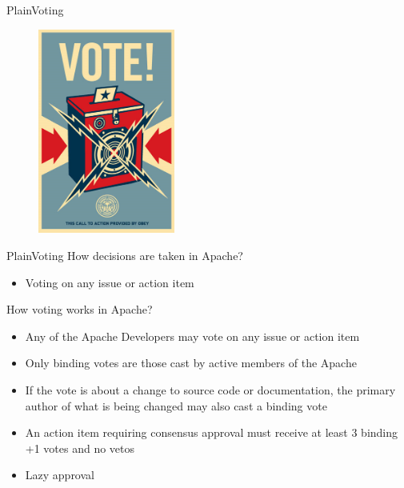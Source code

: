 \documentclass[10pt]{beamer}
\begin{document}
\begin{frame}{Plain}{Voting}
  \begin{figure}[ht]
    \centering
    \includegraphics[width=0.4\textwidth, keepaspectratio=true]{images/vote.jpg}
  \end{figure}
\end{frame}

\begin{frame}{Plain}{Voting}
  How decisions are taken in Apache? \pause
  \begin{itemize}
    \item Voting on any issue or action item \pause
  \end{itemize}

  How voting works in Apache? \pause
  \begin{itemize}
    \item Any of the Apache Developers may vote on any issue or action
          item \pause
    \item Only binding votes are those cast by active members of the
          Apache \pause
    \item If the vote is about a change to source code or documentation,
          the primary author of what is being changed may also cast a binding
          vote \pause
    \item An action item requiring consensus approval must receive at least 3
          binding +1 votes and no vetos \pause
    \item Lazy approval
  \end{itemize}
\end{frame}

\end{document}
